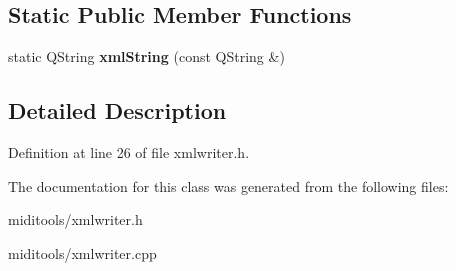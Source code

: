 \subsection*{Static Public Member Functions}
\begin{DoxyCompactItemize}
\item 
\mbox{\label{class_xml_writer_ac75b3e5a95c784720452495b95f26466}} 
static Q\+String {\bfseries xml\+String} (const Q\+String \&)
\end{DoxyCompactItemize}


\subsection{Detailed Description}


Definition at line 26 of file xmlwriter.\+h.



The documentation for this class was generated from the following files\+:\begin{DoxyCompactItemize}
\item 
miditools/xmlwriter.\+h\item 
miditools/xmlwriter.\+cpp\end{DoxyCompactItemize}
